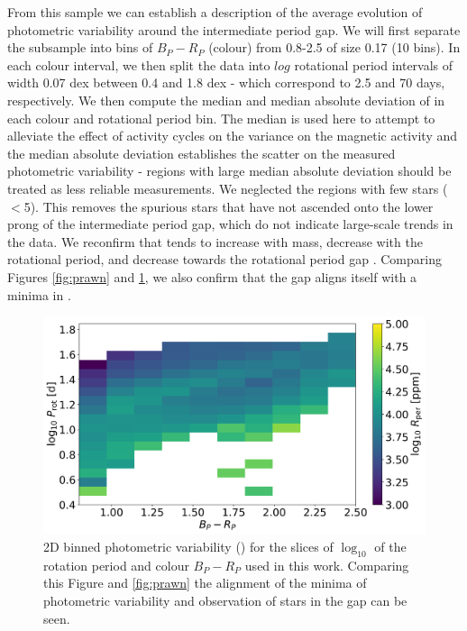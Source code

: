 From this sample we can establish a description of the average evolution of photometric variability around the intermediate period gap.
We will first separate the subsample into bins of $B_P - R_P$ (colour) from 0.8-2.5 of size 0.17 (10 bins).
In each colour interval, we then split the data into $log$ rotational period intervals of width 0.07 dex between 0.4 and 1.8 dex - which correspond to 2.5 and 70 days, respectively.
We then compute the median and median absolute deviation of \rper{} in each colour and rotational period bin.
The median is used here to attempt to alleviate the effect of activity cycles on the variance on the magnetic activity and the median absolute deviation establishes the scatter on the measured photometric variability - regions with large median absolute deviation should be treated as less reliable measurements.
We neglected the regions with few stars ($<$5).
This removes the spurious stars that have not ascended onto the lower prong of the intermediate period gap, which do not indicate large-scale trends in the data.
We reconfirm that \rper{} tends to increase with mass, decrease with the rotational period, and decrease towards the rotational period gap \citep{reinhold_stellar_2020, santos_surface_2021}.
Comparing Figures \ref{fig:prawn} and \ref{fig:binned_rper_full_sample}, we also confirm that the gap aligns itself with a minima in \rper{}.

\begin{figure}
\centering
    \includegraphics[width=\textwidth]{Figures/rot_gap_figures/rot_dist_binned.png}
    \caption{
    2D binned photometric variability (\rper{}) for the slices of $\log_10$ of the rotation period and colour \gaia $B_P-R_P$ used in this work. Comparing this Figure and \ref{fig:prawn} the alignment of the minima of photometric variability and observation of stars in the gap can be seen.}
    \label{fig:binned_rper_full_sample}
\end{figure}


